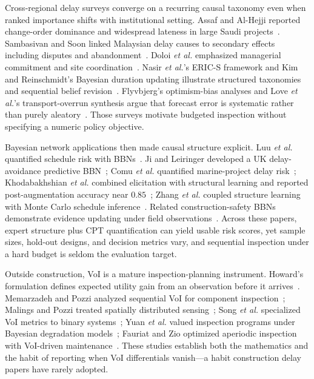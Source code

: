 Cross-regional delay surveys converge on a recurring causal taxonomy even when ranked importance shifts with institutional setting. Assaf and Al-Hejji reported change-order dominance and widespread lateness in large Saudi projects~\cite{Assaf2006}. Sambasivan and Soon linked Malaysian delay causes to secondary effects including disputes and abandonment~\cite{Sambasivan2007}. Doloi \textit{et al.} emphasized managerial commitment and site coordination~\cite{Doloi2012}. Nasir \textit{et al.}'s ERIC-S framework and Kim and Reinschmidt's Bayesian duration updating illustrate structured taxonomies and sequential belief revision~\cite{Nasir2003,Kim2016}. Flyvbjerg's optimism-bias analyses and Love \textit{et al.}'s transport-overrun synthesis argue that forecast error is systematic rather than purely aleatory~\cite{Flyvbjerg2009,Love2015}. Those surveys motivate budgeted inspection without specifying a numeric policy objective.

Bayesian network applications then made causal structure explicit. Luu \textit{et al.} quantified schedule risk with BBNs~\cite{Luu2009}. Ji and Leiringer developed a UK delay-avoidance predictive BBN~\cite{Ji2021}; Comu \textit{et al.} quantified marine-project delay risk~\cite{Comu2023}; Khodabakhshian \textit{et al.} combined elicitation with structural learning and reported post-augmentation accuracy near $0.85$~\cite{Khodabakhshian2025}; Zhang \textit{et al.} coupled structure learning with Monte Carlo schedule inference~\cite{Zhang2021BNMCS}. Related construction-safety BBNs demonstrate evidence updating under field observations~\cite{Wu2015,Wang2016,Leu2012}. Across these papers, expert structure plus CPT quantification can yield usable risk scores, yet sample sizes, hold-out designs, and decision metrics vary, and sequential inspection under a hard budget is seldom the evaluation target.

Outside construction, VoI is a mature inspection-planning instrument. Howard's formulation defines expected utility gain from an observation before it arrives~\cite{Howard1966}. Memarzadeh and Pozzi analyzed sequential VoI for component inspection~\cite{Memarzadeh2016}; Malings and Pozzi treated spatially distributed sensing~\cite{Malings2016}; Song \textit{et al.} specialized VoI metrics to binary systems~\cite{Song2021}; Yuan \textit{et al.} valued inspection programs under Bayesian degradation models~\cite{Yuan2021}; Fauriat and Zio optimized aperiodic inspection with VoI-driven maintenance~\cite{Fauriat2020}. These studies establish both the mathematics and the habit of reporting when VoI differentials vanish---a habit construction delay papers have rarely adopted.

